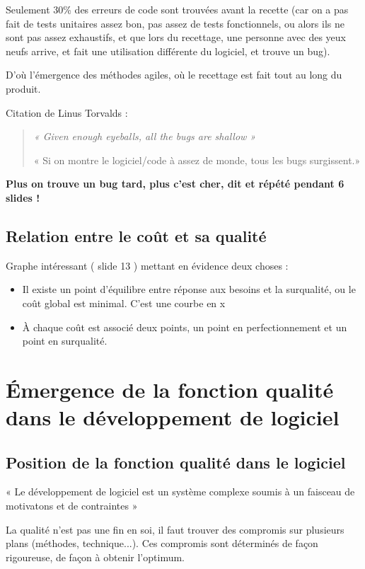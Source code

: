 Seulement 30\% des erreurs de code sont trouvées avant la recette (car on a pas fait de tests unitaires assez bon, pas assez de tests fonctionnels, ou alors ils ne sont pas assez exhaustifs, et que lors du recettage, une personne avec des yeux neufs arrive, et fait une utilisation différente du logiciel, et trouve un bug). 

D’où l'émergence des méthodes agiles, où le recettage est fait tout au long du produit.

 Citation de Linus Torvalds :
\begin{quote}
\em « Given enough eyeballs, all the bugs are shallow »

 « Si on montre le logiciel/code à assez de monde, tous les bugs surgissent.»
\end{quote}

\textbf{Plus on trouve un bug  tard, plus c'est cher, dit et répété pendant 6 slides !}

	\subsection{Relation entre le coût et sa qualité}

	Graphe intéressant ( slide 13 ) mettant en évidence deux choses :

	\begin{itemize}
    \item Il existe un point d'équilibre entre réponse aux besoins et la surqualité, ou le coût global est minimal. C’est une courbe en x
    \item À chaque coût est associé deux points, un point en perfectionnement et un point en surqualité.
	\end{itemize}



\section{Émergence de la fonction qualité dans le développement de logiciel}

	\subsection{Position de la fonction qualité dans le logiciel}

    « Le développement de logiciel est un système complexe soumis à un faisceau de motivatons et de contraintes »

La qualité n’est pas une fin en soi, il faut trouver des compromis sur plusieurs plans (méthodes, technique...). Ces compromis sont déterminés de façon rigoureuse, de façon à obtenir l’optimum.

